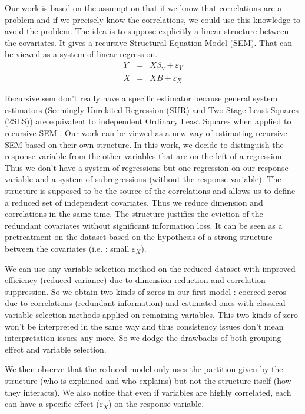 \documentclass[11pt,a4paper]{article}
\begin{document}
	Our work is based on the assumption that if we know that correlations are a problem and if we precisely know the correlations, we could use this knowledge to avoid the problem.
	The idea is to suppose explicitly a linear structure between the covariates. It gives a recursive Structural Equation Model (SEM)\cite{davidson1993estimation}. That can be viewed as a system of linear regression. 	
		\begin{eqnarray}
		Y&=& X\beta_Y+\varepsilon_Y \\
		X&=&XB+ \varepsilon_{X} 
\end{eqnarray}				

	Recursive sem don't really have a specific estimator because general system estimators (Seemingly Unrelated Regression (SUR)\cite{SURzellner} and Two-Stage Least Squares (2SLS)) are equivalent to independent Ordinary Least Squares when applied to recursive SEM \cite{TIMM}. Our work can be viewed as a new way of estimating recursive SEM based on their own structure.
	  In this work, we decide to distinguish the response variable from the other variables that are on the left of a regression. Thus we don't have a system of regressions but one regression on our response variable and a system of subregressions (without the response variable).
	  The structure is supposed to be the source of the correlations and allows us to define a reduced set of independent covariates. Thus we reduce dimension and correlations in the same time. The structure justifies the eviction of the redundant covariates without significant information loss. It can be seen as a pretreatment on the dataset based on the hypothesis of a strong structure between the covariates (i.e. : small $\varepsilon_X$).
	  
	We can use any variable selection method on the reduced dataset with improved efficiency (reduced variance) due to dimension reduction and correlation suppression. So we obtain two kinds of zeros in our first model : coerced zeros due to correlations (redundant information) and estimated ones with classical variable selection methods applied on remaining variables. This two kinds of zero won't be interpreted in the same way and thus consistency issues don't mean interpretation issues any more. So we dodge the drawbacks of both grouping effect and variable selection.
 	
 	We then observe that the reduced model only uses the partition given by the structure (who is explained and who explains) but not the structure itself (how they interacts). We also notice that even if variables are highly correlated, each can have a specific effect ($\varepsilon_X$) on the response variable.
 	
\end{document}
